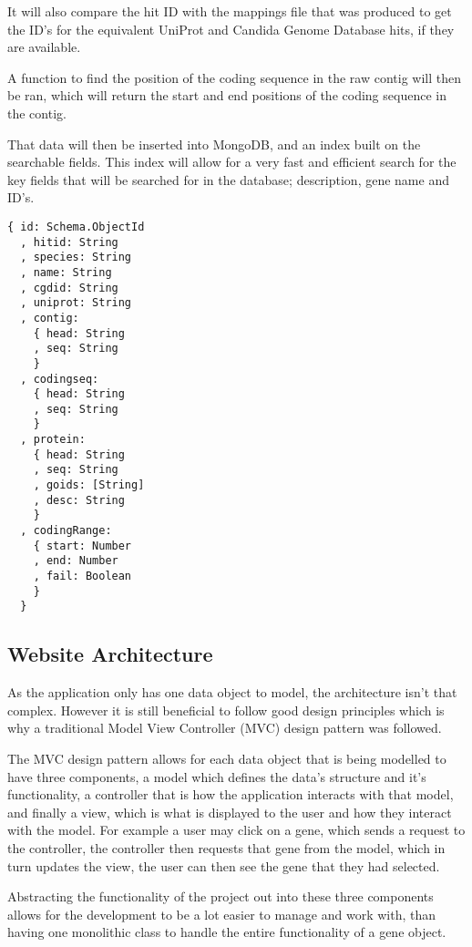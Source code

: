 It will also compare the hit ID with the mappings file that was produced to get the ID's for the equivalent UniProt and Candida Genome Database hits, if they are available. 

A function to find the position of the coding sequence in the raw contig will then be ran, which will return the start and end positions of the coding sequence in the contig.

That data will then be inserted into MongoDB, and an index built on the searchable fields. This index will allow for a very fast and efficient search for the key fields that will be searched for in the database; description, gene name and ID's.

\begin{lstlisting}[caption=The database schema that will represent a gene in the database.]
  { id: Schema.ObjectId
  , hitid: String
  , species: String
  , name: String
  , cgdid: String
  , uniprot: String
  , contig: 
    { head: String
    , seq: String 
    }
  , codingseq: 
    { head: String
    , seq: String 
    }
  , protein: 
    { head: String
    , seq: String
    , goids: [String]
    , desc: String 
    }
  , codingRange: 
    { start: Number
    , end: Number
    , fail: Boolean 
    }
  }
\end{lstlisting}

    
\subsection{Website Architecture}
As the application only has one data object to model, the architecture isn't that complex. However it is still beneficial to follow good design principles which is why a traditional Model View Controller (MVC) design pattern\cite{mvc} was followed. 

The MVC design pattern allows for each data object that is being modelled to have three components, a model which defines the data's structure and it's functionality, a controller that is how the application interacts with that model, and finally a view, which is what is displayed to the user and how they interact with the model. For example a user may click on a gene, which sends a request to the controller, the controller then requests that gene from the model, which in turn updates the view, the user can then see the gene that they had selected. 

Abstracting the functionality of the project out into these three components allows for the development to be a lot easier to manage and work with, than having one monolithic class to handle the entire functionality of a gene object.

